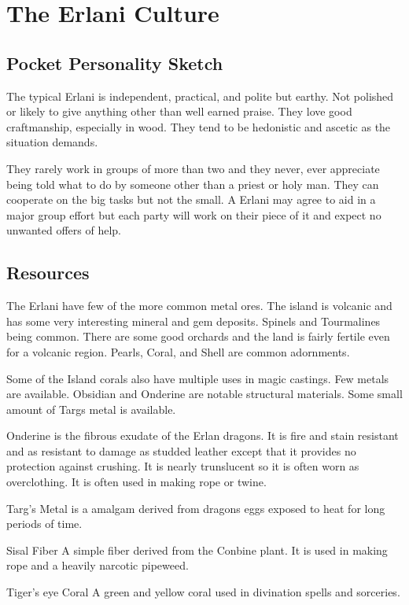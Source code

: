 \chapter{The Erlani Culture}

\section{Pocket Personality Sketch}

The typical Erlani is independent, practical, and 
polite but earthy. Not polished or likely to give anything other 
than well earned praise. They love good craftmanship, especially in wood.
They tend to be hedonistic and ascetic as the situation demands.

They rarely work in groups of more than two and they never, ever 
appreciate being told what to do by someone other than a priest or holy man.
They can cooperate on the big tasks but not the small. A Erlani
may agree to aid in a major group effort but each party will work on 
their piece of it and expect no unwanted offers of help.

\section{Resources}

The Erlani have few of the more common metal ores.
The island is volcanic and has some very
interesting mineral and gem deposits. Spinels and Tourmalines being
common. There are some good orchards and the land is fairly
fertile even for a volcanic region. Pearls, Coral, and Shell are common
adornments.

Some of the Island corals also have multiple uses in magic castings.
Few metals are available. Obsidian and Onderine are notable structural
materials. Some small amount of Targs metal is available.


\begin{relate}
        \item[Onderine]
        is the fibrous exudate of the Erlan dragons. It is fire and stain
        resistant and as resistant to damage as studded leather except that
        it provides no protection against crushing. It is nearly trunslucent
        so it is often worn as overclothing. It is often used in making rope
        or twine.

        \item[Targ's Metal]
        is a amalgam derived from dragons eggs exposed to heat for long
        periods of time.

		\item[Sisal Fiber] A simple fiber derived from the Conbine plant. 
		It is used in making rope and a heavily narcotic pipeweed.

		\item[Tiger's eye Coral] A green and yellow coral used in divination
        spells and sorceries.

\end{relate}

